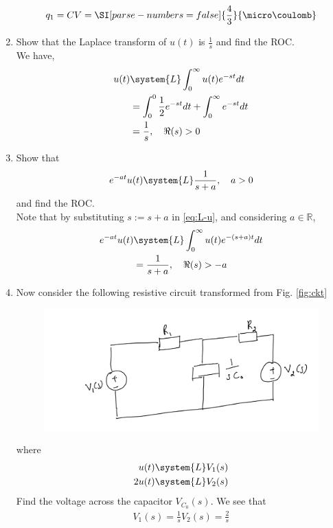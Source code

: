 \documentclass[journal,12pt,twocolumn]{IEEEtran}
\renewcommand\thesection{\arabic{section}}
\begin{document}
\begin{enumerate}[label=\arabic*.,ref=\thesection.\theenumi]
\begin{align}
	q_1 = CV = \SI[parse-numbers=false]{\frac{4}{3}}{\micro\coulomb}
\end{align}
\item Show that the Laplace transform of $u(t)$ is $\frac{1}{s}$ and find the ROC. \\
\solution
We have,
\begin{align}
	u(t) &\system{L} \int_{0}^{\infty}u(t)e^{-st}dt \\
	&= \int_{0}^{0}\frac{1}{2}e^{-st}dt + \int_{0}^{\infty}e^{-st}dt \\
	&= \frac{1}{s}, \quad \Re{(s)} > 0
	\label{eq:L-u}
\end{align}
\item Show that 
\begin{align}
	e^{-at}u(t) \system{L} \frac{1}{s+a}, \quad a > 0
\end{align}
and find the ROC. \\
\solution
Note that by substituting $s := s + a$ in \eqref{eq:L-u}, and considering
$a \in \mathbb{R}$,
\begin{align}
	e^{-at}u(t) &\system{L} \int_{0}^{\infty}u(t)e^{-(s + a)t}dt \\
	&= \frac{1}{s + a}, \quad \Re{(s)} > -a
	\label{eq:L-u-shift}
\end{align}
\item Now consider the following resistive circuit transformed from 
Fig. \ref{fig:ckt}
\begin{figure}[!ht]
	\centering
	\includegraphics[width=\columnwidth]{lap-ckt.jpg}
	\caption{}
	\label{fig:lap-ckt}
\end{figure}
where 
\begin{align}
	u(t) \system{L} V_1(s)
	\\
	2u(t) \system{L} V_2(s)
\end{align}
Find the voltage across the capacitor $V_{C_0}(s)$.
\solution
We see that
\begin{align}
	V_1(s) = \frac{1}{s}
	V_2(s) = \frac{2}{s}

\end{align}
\end{enumerate}
\end{document}
